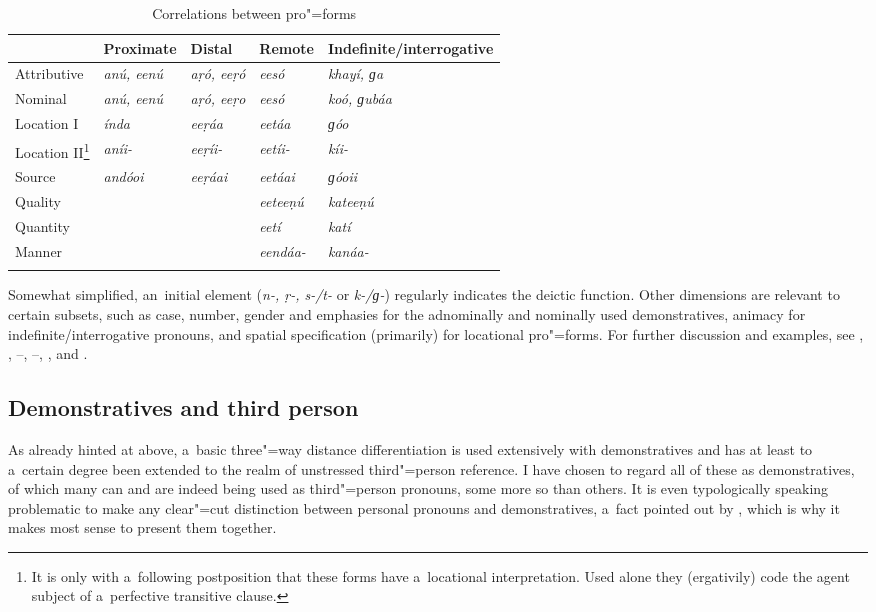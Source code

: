 \begin{table}[ht]
\caption{Correlations between pro"=forms}
\begin{tabularx}{\textwidth}{ Q Q Q Q Q }
\lsptoprule
&
Proximate
&
Distal
&
Remote
&
Indefinite/{\allowbreak}interrogative\\\hline
Attributive &
\textit{anú, eenú} &
\textit{aṛó, eeṛó} &
\textit{eesó} &
\textit{khayí, ɡa} \\
Nominal &
\textit{anú, eenú} &
\textit{aṛó, eeṛo} &
\textit{eesó} &
\textit{koó, ɡubáa} \\
Location I &
\textit{índa} &
\textit{eeṛáa} &
\textit{eetáa} &
\textit{ɡóo} \\
Location II\footnote{It is only with a~following postposition that these forms have a~locational interpretation. Used alone they (ergativily) code the agent subject of a~perfective transitive clause.} &
\textit{aníi-} &
\textit{eeṛíi-} &
\textit{eetíi-} &
\textit{kíi-} \\
Source &
\textit{andóoi} &
\textit{eeṛáai} &
\textit{eetáai} &
\textit{ɡóoii} \\
Quality &
&
&
\textit{eeteeṇú} &
\textit{kateeṇú} \\
Quantity &
&
&
\textit{eetí} &
\textit{katí} \\
Manner &
&
&
\textit{eendáa-} &
\textit{kanáa-} \\\lspbottomrule
\end{tabularx}
\label{tab:5-2}
\end{table}

Somewhat simplified, an~initial element (\textit{n-, ṛ-, s-/t-} or \textit{k-/ɡ-}) regularly indicates the deictic function. Other dimensions are relevant to certain subsets, such as case, number, gender and emphasies for the adnominally and nominally used demonstratives, animacy for indefinite/interrogative pronouns, and spatial specification (primarily) for locational pro"=forms. For further discussion and examples, see , , --, --, ,  and .

\subsection{Demonstratives and third person}
\label{subsec:5-2-2}


As already hinted at above, a~basic three"=way distance differentiation is used extensively with demonstratives and has at least to a~certain degree been extended to the realm of unstressed third"=person reference. I have chosen to regard all of these as demonstratives, of which many can and are indeed being used as third"=person pronouns, some more so than others. It is even typologically speaking problematic to make any clear"=cut distinction between personal pronouns and demonstratives, a~fact pointed out by \citet[206]{himmelmann1996}, which is why it makes most sense to present them together.



